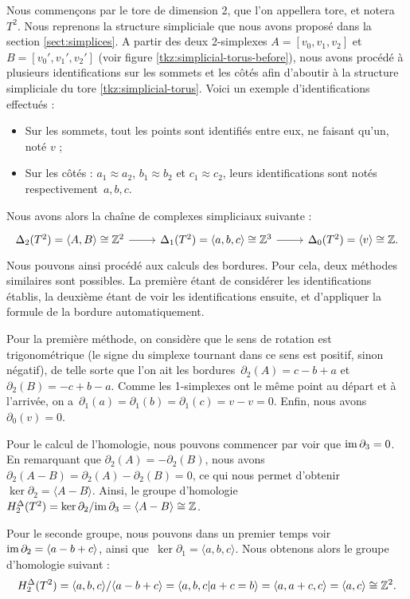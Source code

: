 \phantom{}

\begin{exemple}
Nous commençons par le tore de dimension 2, que l'on appellera tore, et notera $T^2$. Nous reprenons la structure simpliciale que nous avons proposé dans la section \ref{sect:simplices}. A partir des deux 2-simplexes $A=[v_0,v_1,v_2]$ et $B=[v_0',v_1',v_2']$ (voir figure \ref{tkz:simplicial-torus-before}), nous avons procédé à plusieurs identifications sur les sommets et les côtés afin d'aboutir à la structure simpliciale du tore \ref{tkz:simplicial-torus}. Voici un exemple d'identifications effectués : \begin{itemize}
    \item Sur les sommets, tout les points sont identifiés entre eux, ne faisant qu'un, noté $v$ ;
    \item Sur les côtés : $a_1\approx a_2$, $b_1\approx b_2$ et $c_1\approx c_2$, leurs identifications sont notés respectivement~$a,b,c$.
\end{itemize}
Nous avons alors la chaîne de complexes simpliciaux suivante : \[\begin{tikzcd}
\Delta_2(T^2)=\langle A,B\rangle\cong\bb{Z}^2\arrow[r]&\Delta_1(T^2)=\langle a,b,c\rangle\cong\bb{Z}^3\arrow[r]&\Delta_0(T^2)=\langle v\rangle\cong\bb{Z}.
\end{tikzcd}\]Nous pouvons ainsi procédé aux calculs des bordures. Pour cela, deux méthodes similaires sont possibles. La première étant de considérer les identifications établis, la deuxième étant de voir les identifications ensuite, et d'appliquer la formule de la bordure automatiquement.

Pour la première méthode, on considère que le sens de rotation est trigonométrique (le signe du simplexe tournant dans ce sens est positif, sinon négatif), de telle sorte que l'on ait les bordures~$\partial_2(A)=c-b+a$ et~${\partial_2(B)=-c+b-a}$. Comme les 1-simplexes ont le même point au départ et à l'arrivée, on a~${\partial_1(a)=\partial_1(b)=\partial_1(c)=v-v=0}$. Enfin, nous avons $\partial_0(v)=0$.

\bigskip Pour le calcul de l'homologie, nous pouvons commencer par voir que $\mathrm{im}\,\partial_3=0$. En remarquant que $\partial_2(A)=-\partial_2(B)$, nous avons ${\partial_2(A-B)=\partial_2(A)-\partial_2(B)=0}$, ce qui nous permet d'obtenir~${\ker\partial_2=\langle A-B\rangle}$. Ainsi, le groupe d'homologie $H^\Delta_2(T^2)=\ker\partial_2/\mathrm{im}\,\partial_3=\langle A-B\rangle\cong \mathbb{Z}$. 

Pour le seconde groupe, nous pouvons dans un premier temps voir $\mathrm{im}\,\partial_2=\langle a-b+c\rangle$, ainsi que~$\ker\partial_1=\langle a,b,c\rangle$. Nous obtenons alors le groupe d'homologie suivant :  $$H^\Delta_2(T^2)=\langle a,b,c\rangle/\langle a-b+c\rangle=\langle a,b,c|a+c=b\rangle=\langle a,a+c,c\rangle=\langle a,c\rangle\cong \mathbb{Z}^2.$$


\end{exemple}
